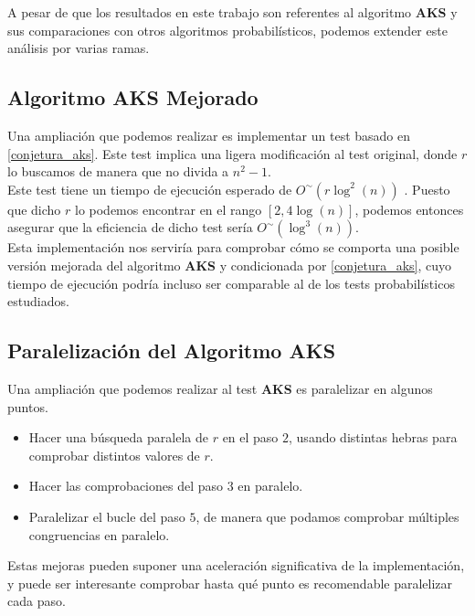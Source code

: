 A pesar de que los resultados en este trabajo son referentes al algoritmo \textbf{AKS} y sus comparaciones con otros algoritmos probabilísticos, podemos extender este análisis por varias ramas.

\subsection{Algoritmo AKS Mejorado}

Una ampliación que podemos realizar es implementar un test basado en \autoref{conjetura_aks}. Este test implica una ligera modificación al test original, donde $r$ lo buscamos de manera que no divida a $n^2 - 1$.\\

Este test tiene un tiempo de ejecución esperado de $O^\sim(r\log^2(n))$ \cite{primes_is_in_p}. Puesto que dicho $r$ lo podemos encontrar en el rango $[2, 4\log(n)]$, podemos entonces asegurar que la eficiencia de dicho test sería $O^\sim(\log^3(n))$.\\

Esta implementación nos serviría para comprobar cómo se comporta una posible versión mejorada del algoritmo \textbf{AKS} y condicionada por \autoref{conjetura_aks}, cuyo tiempo de ejecución podría incluso ser comparable al de los tests probabilísticos estudiados.

\subsection{Paralelización del Algoritmo AKS}

Una ampliación que podemos realizar al test \textbf{AKS} es paralelizar en algunos puntos.

\begin{itemize}
	\item Hacer una búsqueda paralela de $r$ en el paso $2$, usando distintas hebras para comprobar distintos valores de $r$.
	
	\item Hacer las comprobaciones del paso $3$ en paralelo.
	
	\item Paralelizar el bucle del paso $5$, de manera que podamos comprobar múltiples congruencias en paralelo.
\end{itemize}

Estas mejoras pueden suponer una aceleración significativa de la implementación, y puede ser interesante comprobar hasta qué punto es recomendable paralelizar cada paso.

